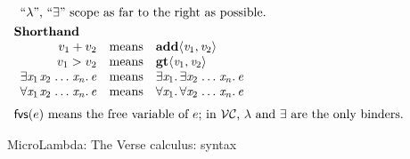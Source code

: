 \documentclass[acmsmall,review,dvipsnames]{acmart}
\newcommand{\Varid}[1]{\mathit{#1}}
\renewcommand{\geq}{\geqslant}
\newcommand{\eg}{\emph{e.g.}}
\newcommand{\versecalc}{$\mathcal{VC}$}
\newcommand{\freevars}[1]{\mathsf{fvs}(#1)}
\newcommand{\disjoint}{\;\#\;}
\begin{document}
\begin{figure}
$$\begin{array}{l}
\begin{array}[t]{l}
          \text{``$\lambda$'', ``\ensuremath{\exists{}}'' scope as far to the right as possible.} \\
    \end{array} \\ \\[-3mm]
    \textbf{Shorthand} \\
    \begin{array}{rcl}
      v_1 + v_2 & \text{means} & \ensuremath{\textbf{add}\langle\Varid{v}_{\mathrm{1}},\Varid{v}_{\mathrm{2}}\rangle} \\
      v_1 > v_2 & \text{means} & \ensuremath{\textbf{gt}\langle\Varid{v}_{\mathrm{1}},\Varid{v}_{\mathrm{2}}\rangle} \\
      \ensuremath{\exists\Varid{x}_{\mathrm{1}}\hspace{0.1em}\Varid{x}_{\mathrm{2}}\;\!\ldots\!\;\Varid{x}_{\Varid{n}}.\,\Varid{e}} & \text{means} & \ensuremath{\exists\Varid{x}_{\mathrm{1}}.\,\exists\Varid{x}_{\mathrm{2}}\;\!\ldots\!\;\Varid{x}_{\Varid{n}}.\,\Varid{e}} \\
      \ensuremath{\forall\Varid{x}_{\mathrm{1}}\hspace{0.1em}\Varid{x}_{\mathrm{2}}\;\!\ldots\!\;\Varid{x}_{\Varid{n}}.\,\Varid{e}} & \text{means} & \ensuremath{\forall\Varid{x}_{\mathrm{1}}.\,\forall\Varid{x}_{\mathrm{2}}\;\!\ldots\!\;\Varid{x}_{\Varid{n}}.\,\Varid{e}} \\
     \end{array} \\
  \\[-2mm]
  \text{$\freevars{e}$ means the free variable of $e$; in \versecalc{}, $\lambda$ and \ensuremath{\exists{}} are the only binders.}
  \end{array}
  $$
\caption{MicroLambda: The Verse calculus: syntax} \label{fig:micro-syntax}
\end{figure}
\end{document}
